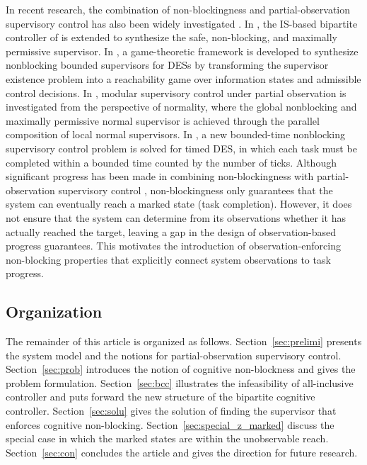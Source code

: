 \documentclass[journal,twoside,web]{ieeecolor}
\begin{document}
In recent research, the combination of non-blockingness and partial-observation supervisory control has also been widely investigated \cite{fokkink2024offline, hou2023distributed, zhang2024quantitatively}.
%
In \cite{yin2016synthesis}, the IS-based bipartite controller of \cite{yin2016uniform} is extended to synthesize the safe, non-blocking, and maximally permissive supervisor.
%
In \cite{xiang2024existence}, a game-theoretic framework is developed to synthesize nonblocking bounded supervisors for DESs by transforming the supervisor existence problem into a reachability game over information states and admissible control decisions.
%
In \cite{jan2024supervisory}, modular supervisory control under partial observation is investigated from the perspective of normality, where the global nonblocking and maximally permissive normal supervisor is achieved through the parallel composition of local normal supervisors.
%
In \cite{zhang2025bounded},  a new bounded-time nonblocking supervisory control problem is solved for timed DES, in which  each task must be completed within a bounded time counted by the number of ticks.
%
Although significant progress has been made in combining non-blockingness with partial-observation supervisory control \cite{fokkink2024offline, hou2023distributed, zhang2024quantitatively}, non-blockingness only guarantees that the system can eventually reach a marked state (task completion). 
However, it does not ensure that the system can determine from its observations whether it has actually reached the target, leaving a gap in the design of observation-based progress guarantees. 
This motivates the introduction of observation-enforcing non-blocking properties that explicitly connect system observations to task progress.


\subsection{Organization}

The remainder of this article is organized as follows.
%
Section~\ref{sec:prelimi} presents the system model and the notions for partial-observation supervisory control.
Section~\ref{sec:prob} introduces the notion of cognitive non-blockness and gives the problem formulation.
Section~\ref{sec:bcc} illustrates the infeasibility of all-inclusive controller and puts forward the new structure of the  bipartite cognitive controller.
Section~\ref{sec:solu} gives the solution of finding the supervisor that enforces cognitive non-blocking.
Section~\ref{sec:special_z_marked} discuss the special case in which the marked states are within the unobservable reach.
Section~\ref{sec:con} concludes the article and gives the direction for future research.
\end{document}
